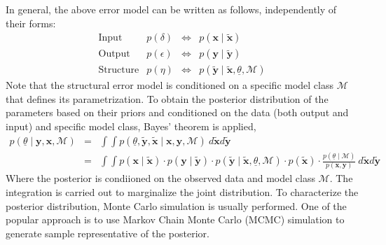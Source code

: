 \documentclass[11pt,titlepage]{article}
\begin{document}
In general, the above error model can be written as follows, independently of their forms:
\begin{equation}
\begin{array}{lrcr} 
	\text{Input} 	& p(\delta)	 	& \iff & p(\mathbf{x} \mid \mathbf{\tilde{x}}) \\ 
	\text{Output} 	& p(\epsilon) 	& \iff & p(\mathbf{y} \mid \mathbf{\tilde{y}}) \\
	\text{Structure}	& p(\eta) 		& \iff & p(\mathbf{\tilde{y}} \mid \mathbf{\tilde{x}}, \underline{\theta}, \mathcal{M}) 
\end{array}
\nonumber
\end{equation}
Note that the structural error model is conditioned on a specific model class $\mathcal{M}$ that defines its parametrization. 
To obtain the posterior distribution of the parameters based on their priors and conditioned on the data (both output and input) and specific model class, Bayes' theorem is applied,
\begin{equation}
\begin{array}{rcl} 
	p(\underline{\theta} \mid \mathbf{y}, \mathbf{x}, \mathcal{M} )	& = & \int \int p(\underline{\theta}, \mathbf{\tilde{y}}, \mathbf{\tilde{x}} \mid \mathbf{x}, \mathbf{y}, \mathcal{M} ) \: d\mathbf{\tilde{x}} d\mathbf{\tilde{y}} \\ 
		& = & \int \int p(\mathbf{x} \mid \mathbf{\tilde{x}}) \cdot p(\mathbf{y} \mid \mathbf{\tilde{y}}) \cdot p(\mathbf{\tilde{y}} \mid \mathbf{\tilde{x}}, \underline{\theta}, \mathcal{M} ) \cdot p(\mathbf{\tilde{x}}) \cdot \frac{p(\underline{\theta} \mid \mathcal{M})}{p(\mathbf{x}, \mathbf{y})} \: d\mathbf{\tilde{x}} d\mathbf{\tilde{y}}
\end{array}
\nonumber
\end{equation}
Where the posterior is condiioned on the observed data and model class $\mathcal{M}$. 
The integration is carried out to marginalize the joint distribution. 
To characterize the posterior distribution, Monte Carlo simulation is usually performed. 
One of the popular approach is to use Markov Chain Monte Carlo (MCMC) simulation to generate sample representative of the posterior.
\end{document}
